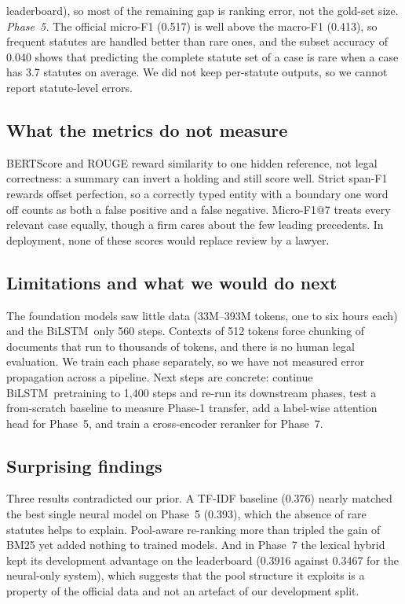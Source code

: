 \documentclass[10pt,a4paper]{article}
\newcommand{\bs}{BiLSTM}
\begin{document}
leaderboard), so most of the remaining gap is ranking error, not the gold-set size. \emph{Phase~5.} The official micro-F1 (0.517) is well above the macro-F1 (0.413), so frequent statutes are handled better than rare ones, and the subset accuracy of 0.040 shows that predicting the complete statute set of a case is rare when a case has 3.7 statutes on average. We did not keep per-statute outputs, so we cannot report statute-level errors.

\subsection{What the metrics do not measure}
BERTScore and ROUGE reward similarity to one hidden reference, not legal correctness: a summary can invert a holding and still score well. Strict span-F1 rewards offset perfection, so a correctly typed entity with a boundary one word off counts as both a false positive and a false negative. Micro-F1@7 treats every relevant case equally, though a firm cares about the few leading precedents. In deployment, none of these scores would replace review by a lawyer.

\subsection{Limitations and what we would do next}
The foundation models saw little data (33M--393M tokens, one to six hours each) and the \bs\ only 560 steps. Contexts of 512 tokens force chunking of documents that run to thousands of tokens, and there is no human legal evaluation. We train each phase separately, so we have not measured error propagation across a pipeline. Next steps are concrete: continue \bs\ pretraining to 1{,}400 steps and re-run its downstream phases, test a from-scratch baseline to measure Phase-1 transfer, add a label-wise attention head for Phase~5, and train a cross-encoder reranker for Phase~7.

\subsection{Surprising findings}
Three results contradicted our prior. A TF-IDF baseline (0.376) nearly matched the best single neural model on Phase~5 (0.393), which the absence of rare statutes helps to explain. Pool-aware re-ranking more than tripled the gain of BM25 yet added nothing to trained models. And in Phase~7 the lexical hybrid kept its development advantage on the leaderboard (0.3916 against 0.3467 for the neural-only system), which suggests that the pool structure it exploits is a property of the official data and not an artefact of our development split.
\end{document}
